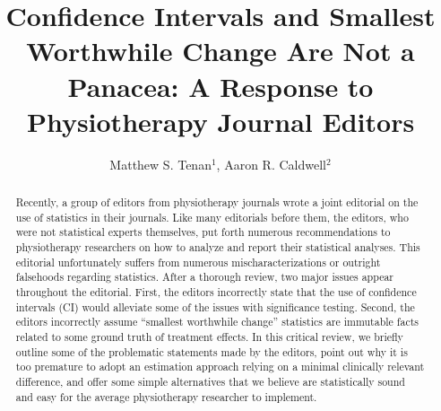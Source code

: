 \documentclass[]{cik}%
\begin{document}
\captionsetup[table]{labelformat=empty}
\captionsetup[figure]{labelformat=empty}
\raggedbottom

\title{Confidence Intervals and Smallest Worthwhile Change Are Not a
Panacea: A Response to Physiotherapy Journal Editors}

\author{
Matthew S. Tenan$^{1}$,
Aaron R. Caldwell$^{2}$}

\address{
  $^{1}$Rockefeller Neuroscience Institute, West Virginia University,
Morgantown, West Virginia, USA\\
  $^{2}$Natick, MA}
\subject{
}


\inserttype{
{\Large }
}




\begin{abstract}
Recently, a group of editors from physiotherapy journals wrote a joint
editorial on the use of statistics in their journals. Like many
editorials before them, the editors, who were not statistical experts
themselves, put forth numerous recommendations to physiotherapy
researchers on how to analyze and report their statistical analyses.
This editorial unfortunately suffers from numerous mischaracterizations
or outright falsehoods regarding statistics. After a thorough review,
two major issues appear throughout the editorial. First, the editors
incorrectly state that the use of confidence intervals (CI) would
alleviate some of the issues with significance testing. Second, the
editors incorrectly assume ``smallest worthwhile change'' statistics are
immutable facts related to some ground truth of treatment effects. In
this critical review, we briefly outline some of the problematic
statements made by the editors, point out why it is too premature to
adopt an estimation approach relying on a minimal clinically relevant
difference, and offer some simple alternatives that we believe are
statistically sound and easy for the average physiotherapy researcher to
implement.
\end{abstract}
\end{document}
